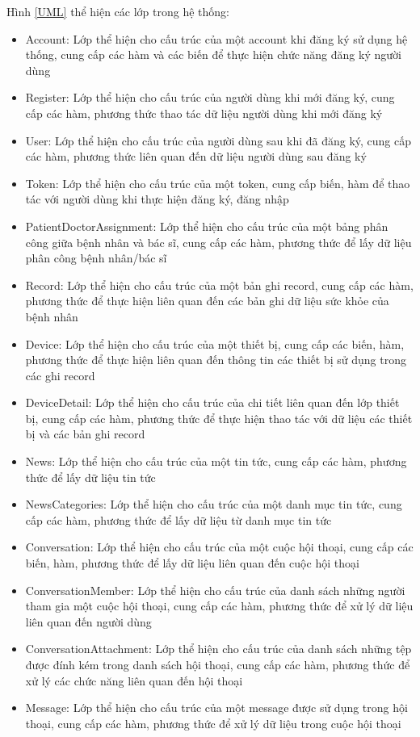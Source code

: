   Hình \ref*{UML} thể hiện các lớp trong hệ thống:
  \begin{itemize}
    \item Account: Lớp thể hiện cho cấu trúc của một account khi đăng ký sử dụng hệ thống, cung cấp các hàm và các biến để thực hiện chức năng đăng ký người dùng
    \item Register: Lớp thể hiện cho cấu trúc của người dùng khi mới đăng ký, cung cấp các hàm, phương thức thao tác dữ liệu người dùng khi mới đăng ký
    \item User: Lớp thể hiện cho cấu trúc của người dùng sau khi đã đăng ký, cung cấp các hàm, phương thức liên quan đến dữ liệu người dùng sau đăng ký
    \item Token: Lớp thể hiện cho cấu trúc của một token, cung cấp biến, hàm để thao tác với người dùng khi thực hiện đăng ký, đăng nhập
    \item PatientDoctorAssignment: Lớp thể hiện cho cấu trúc của một bảng phân công giữa bệnh nhân và bác sĩ, cung cấp các hàm, phương thức để lấy dữ liệu phân công bệnh nhân/bác sĩ
    \item Record: Lớp thể hiện cho cấu trúc của một bản ghi record, cung cấp các hàm, phương thức để thực hiện liên quan đến các bản ghi dữ liệu sức khỏe của bệnh nhân
    \item Device: Lớp thể hiện cho cấu trúc của một thiết bị, cung cấp các biến, hàm, phương thức để thực hiện liên quan đến thông tin các thiết bị sử dụng trong các ghi record
    \item DeviceDetail: Lớp thể hiện cho cấu trúc của chi tiết liên quan đến lớp thiết bị, cung cấp các hàm, phương thức để thực hiện thao tác với dữ liệu các thiết bị và các bản ghi record
    \item News: Lớp thể hiện cho cấu trúc của một tin tức, cung cấp các hàm, phương thức để lấy dữ liệu tin tức
    \item NewsCategories: Lớp thể hiện cho cấu trúc của một danh mục tin tức, cung cấp các hàm, phương thức để lấy dữ liệu từ danh mục tin tức
    \item Conversation: Lớp thể hiện cho cấu trúc của một cuộc hội thoại, cung cấp các biến, hàm, phương thức để lấy dữ liệu liên quan đến cuộc hội thoại
    \item ConversationMember: Lớp thể hiện cho cấu trúc của danh sách những người tham gia một cuộc hội thoại, cung cấp các hàm, phương thức để xử lý dữ liệu liên quan đến người dùng
    \item ConversationAttachment: Lớp thể hiện cho cấu trúc của danh sách những tệp được đính kém trong danh sách hội thoại, cung cấp các hàm, phương thức để xử lý các chức năng liên quan đến hội thoại
    \item Message: Lớp thể hiện cho cấu trúc của một message được sử dụng trong hội thoại, cung cấp các hàm, phương thức để xử lý dữ liệu trong cuộc hội thoại
  \end{itemize}
